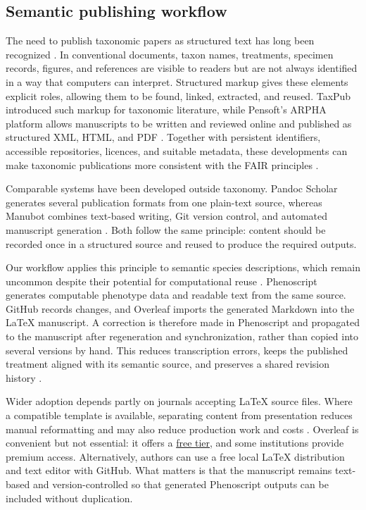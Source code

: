 \subsection*{Semantic publishing workflow}

The need to publish taxonomic papers as structured text has long been recognized \citep{penev2010semantic, penev2011xml, miller2012cybertaxonomic}. In conventional documents, taxon names, treatments, specimen records, figures, and references are visible to readers but are not always identified in a way that computers can interpret. Structured markup gives these elements explicit roles, allowing them to be found, linked, extracted, and reused. TaxPub introduced such markup for taxonomic literature, while Pensoft's ARPHA platform allows manuscripts to be written and reviewed online and published as structured XML, HTML, and PDF \citep{penev2011xml, stoev2018arpha}. Together with persistent identifiers, accessible repositories, licences, and suitable metadata, these developments can make taxonomic publications more consistent with the FAIR principles \citep{wilkinson2016fair}.

Comparable systems have been developed outside taxonomy. Pandoc Scholar generates several publication formats from one plain-text source, whereas Manubot combines text-based writing, Git version control, and automated manuscript generation \citep{krewinkel2017formatting, himmelstein2020open}. Both follow the same principle: content should be recorded once in a structured source and reused to produce the required outputs.

Our workflow applies this principle to semantic species descriptions, which remain uncommon despite their potential for computational reuse \citep{balhoff2013semantic, deans2015phenotypes, montanaro2024computable}. Phenoscript generates computable phenotype data and readable text from the same source. GitHub records changes, and Overleaf imports the generated Markdown into the \LaTeX{} manuscript. A correction is therefore made in Phenoscript and propagated to the manuscript after regeneration and synchronization, rather than copied into several versions by hand. This reduces transcription errors, keeps the published treatment aligned with its semantic source, and preserves a shared revision history \citep{ram2013git, braga2023github}.

Wider adoption depends partly on journals accepting \LaTeX{} source files. Where a compatible template is available, separating content from presentation reduces manual reformatting and may also reduce production work and costs \citep{bar2021reproducible, krewinkel2017formatting}. Overleaf is convenient but not essential: it offers a \href{https://www.overleaf.com/user/subscription/plans}{free tier}, and some institutions provide premium access. Alternatively, authors can use a free local \LaTeX{} distribution and text editor with GitHub. What matters is that the manuscript remains text-based and version-controlled so that generated Phenoscript outputs can be included without duplication.

